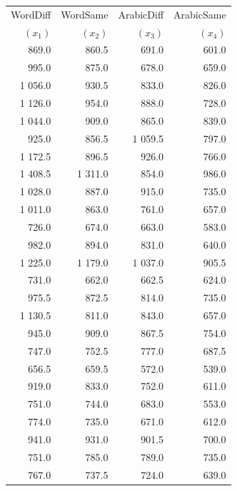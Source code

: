 \begin{mvtable}
\label{tab:6.8}
\begin{tabular}{rrrr}
\toprule
WordDiff & WordSame & ArabicDiff & ArabicSame\\
$(x_1)$ & $(x_2)$ & $(x_3)$ & $(x_4)$\\\midrule
869.0 & 860.5 & 691.0 & 601.0\\
995.0 & 875.0 & 678.0 & 659.0\\
1 056.0 & 930.5 & 833.0 & 826.0\\
1 126.0 & 954.0 & 888.0 & 728.0\\
1 044.0 & 909.0 & 865.0 & 839.0\\
925.0 & 856.5 & 1 059.5 & 797.0\\
1 172.5 & 896.5 & 926.0 & 766.0\\
1 408.5 & 1 311.0 & 854.0 & 986.0\\
1 028.0 & 887.0 & 915.0 & 735.0\\
1 011.0 & 863.0 & 761.0 & 657.0\\
726.0 & 674.0 & 663.0 & 583.0\\
982.0 & 894.0 & 831.0 & 640.0\\
1 225.0 & 1 179.0 & 1 037.0 & 905.5\\
731.0 & 662.0 & 662.5 & 624.0\\
975.5 & 872.5 & 814.0 & 735.0\\
1 130.5 & 811.0 & 843.0 & 657.0\\
945.0 & 909.0 & 867.5 & 754.0\\
747.0 & 752.5 & 777.0 & 687.5\\
656.5 & 659.5 & 572.0 & 539.0\\
919.0 & 833.0 & 752.0 & 611.0\\
751.0 & 744.0 & 683.0 & 553.0\\
774.0 & 735.0 & 671.0 & 612.0\\
941.0 & 931.0 & 901.5 & 700.0\\
751.0 & 785.0 & 789.0 & 735.0\\
767.0 & 737.5 & 724.0 & 639.0\\
\bottomrule
\end{tabular}
\end{mvtable}
